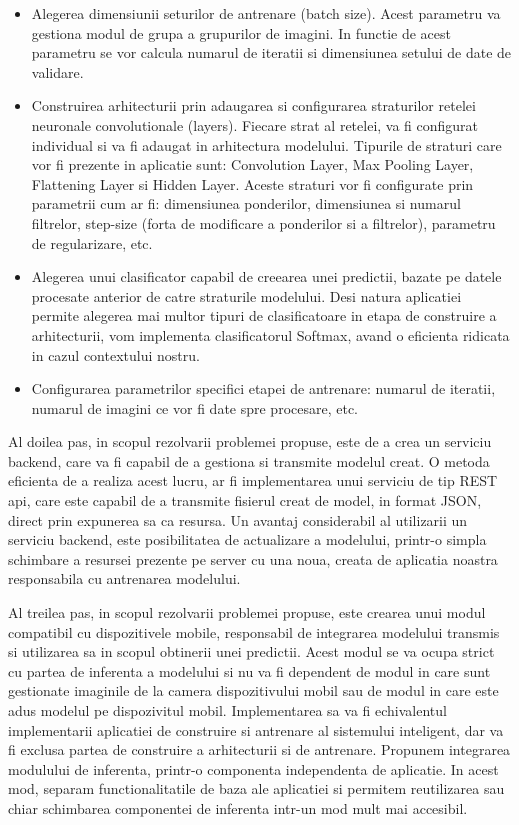 	\begin{itemize}
	\item	Alegerea dimensiunii seturilor de antrenare (batch size). Acest parametru va gestiona modul de grupa a grupurilor de imagini. In functie de acest parametru se vor calcula numarul de iteratii si dimensiunea setului de date de validare.
	
	
	\item	Construirea arhitecturii prin adaugarea si configurarea straturilor retelei neuronale convolutionale (layers).  Fiecare strat al retelei, va fi configurat individual si va fi adaugat in arhitectura modelului. Tipurile de straturi care vor fi prezente in aplicatie sunt: Convolution Layer, Max Pooling Layer, Flattening Layer si Hidden Layer. Aceste straturi vor fi configurate prin parametrii cum ar fi: dimensiunea ponderilor, dimensiunea si numarul filtrelor, step-size (forta de modificare a ponderilor si a filtrelor), parametru de regularizare, etc.
	
	\item	Alegerea unui clasificator capabil de creearea unei predictii, bazate pe datele procesate anterior de catre straturile modelului. Desi  natura aplicatiei permite alegerea mai multor tipuri de clasificatoare in etapa de construire a arhitecturii, vom implementa clasificatorul Softmax, avand o eficienta ridicata in cazul contextului nostru.
	
	\item	Configurarea parametrilor specifici etapei de antrenare: numarul de iteratii, numarul de imagini ce vor fi date spre procesare, etc.
	
	\end{itemize}

	Al doilea pas, in scopul rezolvarii problemei propuse, este de a crea un serviciu backend, care va fi capabil de a gestiona si transmite modelul creat. O metoda eficienta de a realiza acest lucru, ar fi implementarea unui serviciu de tip REST api, care este capabil de a transmite fisierul creat de model, in format JSON, direct prin expunerea sa ca resursa. 
	Un avantaj considerabil al utilizarii un serviciu backend, este posibilitatea de actualizare a modelului, printr-o simpla schimbare a resursei prezente pe server cu una noua, creata de aplicatia noastra responsabila cu antrenarea modelului. 
	
	Al treilea pas, in scopul rezolvarii problemei propuse, este crearea unui modul compatibil cu dispozitivele mobile, responsabil de integrarea modelului transmis si utilizarea sa in scopul obtinerii unei predictii. 
	Acest modul se va ocupa strict cu partea de inferenta a modelului si nu va fi dependent de modul in care sunt gestionate imaginile de la camera dispozitivului mobil sau de modul in care este adus  modelul pe dispozivitul mobil. Implementarea sa va fi echivalentul implementarii aplicatiei de construire si antrenare al sistemului inteligent, dar va fi exclusa partea de construire a arhitecturii si de antrenare. 
	Propunem integrarea modulului de inferenta, printr-o componenta independenta de aplicatie. In acest mod, separam functionalitatile de baza ale aplicatiei si permitem reutilizarea sau chiar schimbarea componentei de inferenta intr-un mod mult mai accesibil.
	
